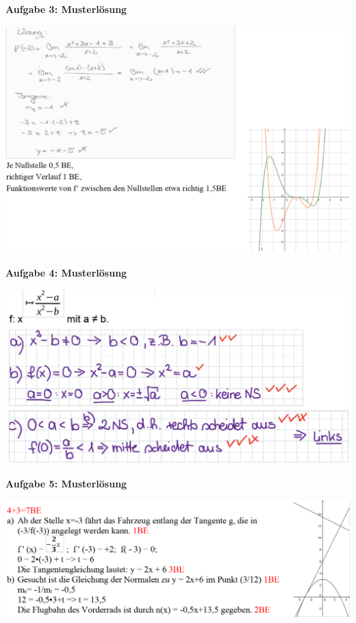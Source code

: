 \documentclass[a4paper,12pt]{article}
\newcommand{\Aufgabe}[1]{
  {
  \vspace*{0.5cm}
  \textsf{\textbf{Aufgabe #1}}
  \vspace*{0.2cm}
  
  }
}
\begin{document}
\newpage
\Aufgabe{3: Musterlösung}
\includegraphics[width=\linewidth]{Q11_1KlausurJanuar2022_ml3.png}

\Aufgabe{4: Musterlösung}
\includegraphics[width=\linewidth]{Q11_1KlausurJanuar2022_ml4.png}

\newpage
\Aufgabe{5: Musterlösung}
\includegraphics[width=\linewidth]{Q11_1KlausurJanuar2022_ml5.png}


\end{document}

